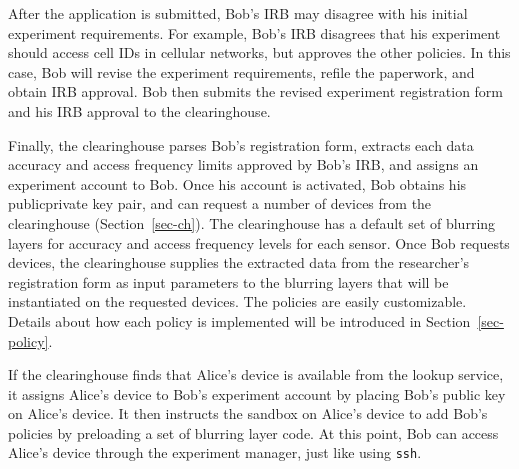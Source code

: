 After the application is submitted, Bob's IRB may disagree with 
his initial experiment requirements. For example, Bob's IRB disagrees 
that his experiment should access cell IDs in cellular networks, but 
approves the other policies. 
In this case, Bob will revise the experiment requirements, refile the paperwork, 
and obtain IRB approval. Bob then submits the revised experiment 
registration form and his IRB approval to the clearinghouse.

Finally, the clearinghouse
parses Bob's registration form, extracts each data accuracy and access 
frequency limits approved by Bob's IRB, and assigns an experiment 
account to Bob. Once his account is activated, 
Bob obtains his publicprivate key pair, and can request a number of devices from the 
clearinghouse (Section~\ref{sec-ch}). The clearinghouse has a default set of blurring layers 
for accuracy and access frequency levels for each sensor. Once Bob requests 
devices, the clearinghouse supplies the extracted data from the 
researcher's registration form as input parameters to
the blurring layers that will be instantiated on the requested devices. 
The policies are easily customizable. Details about
how each policy is implemented will be introduced in Section~\ref{sec-policy}.

%
If the clearinghouse finds that Alice's device is available from the 
lookup service, it
assigns Alice's device to Bob's experiment account by placing Bob's
public key on Alice's device. It then instructs 
the sandbox on Alice's device to add Bob's policies by preloading
a set of blurring layer code. At this point, Bob can access Alice's 
device through the experiment manager, just like using \texttt{ssh}.


